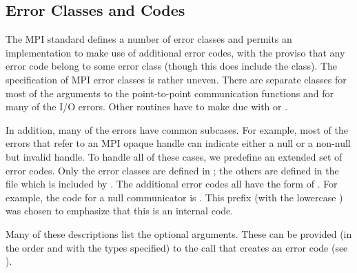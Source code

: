 %
\subsection{Error Classes and Codes}
The MPI standard defines a number of error classes and permits an
implementation to make use of additional error codes, with the proviso that
any error code belong to some error class (though this does include the
 class).  
The specification of MPI error classes is rather uneven.  There are separate
classes for most of the arguments to the point-to-point communication
functions and for many of the I/O errors.  Other routines have to make due
with  or .

In addition, many of the errors have common subcases.  For example, most of
the errors that refer to an MPI opaque handle can indicate either a null or a
non-null but invalid handle.   To handle all of these cases, we predefine an
extended set of error codes.  Only the error classes are defined in
; the others are defined in the file  which is
included by .  The additional error
codes all have the form of .  For example,
the code for a null communicator is .
This prefix (with the lowercase ) was chosen to emphasize that this is
an internal code.


Many of these descriptions list the optional arguments.  These can be provided
(in the order and with the types specified) to the call that creates an error
code (see ). 

